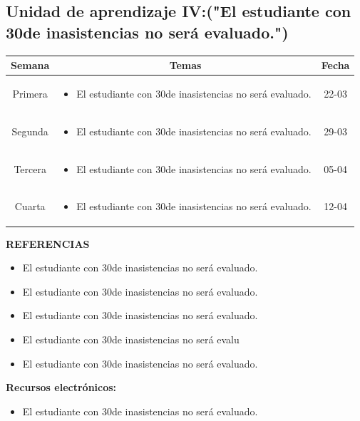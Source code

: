 \documentclass[a4paper]{article}
\begin{document}
\subsection{Unidad de aprendizaje IV:("El estudiante con 30de inasistencias no será evaluado.")}
\begin{table}[ht]
\centering
\begin{tabular}{|c|c|c|}
\hline
\textbf{Semana} & \textbf{Temas} & \textbf{Fecha} \\ 
\hline
Primera 
& \begin{minipage}[t]{10cm}
\begin{itemize}
\item El estudiante con 30de inasistencias no será evaluado.
\end{itemize}
\end{minipage} & 22-03\\ 
\hline 
Segunda 
& \begin{minipage}[t]{10cm}
\begin{itemize}
\item El estudiante con 30de inasistencias no será evaluado.
\end{itemize}
\end{minipage} & 29-03\\ 
\hline 
Tercera 
& \begin{minipage}[t]{10cm}
\begin{itemize}
\item El estudiante con 30de inasistencias no será evaluado.
\end{itemize}
\end{minipage} & 05-04 \\ 
\hline 
Cuarta 
& \begin{minipage}[t]{10cm}
\begin{itemize}
\item El estudiante con 30de inasistencias no será evaluado.
\end{itemize}
\end{minipage} & 12-04 \\ 
\hline 
\end{tabular}
\end{table}
{\huge \bf REFERENCIAS}\\[0.3cm]
\begin{itemize}
\item El estudiante con 30de inasistencias no será evaluado.
\item El estudiante con 30de inasistencias no será evaluado.
\item El estudiante con 30de inasistencias no será evaluado.
\item El estudiante con 30de inasistencias no será evalu
\item El estudiante con 30de inasistencias no será evaluado.
\end{itemize}
{\huge \bf Recursos electrónicos:}\\[0.3cm]
\begin{itemize}
\item El estudiante con 30de inasistencias no será evaluado.
\end{itemize}
\end{document}
